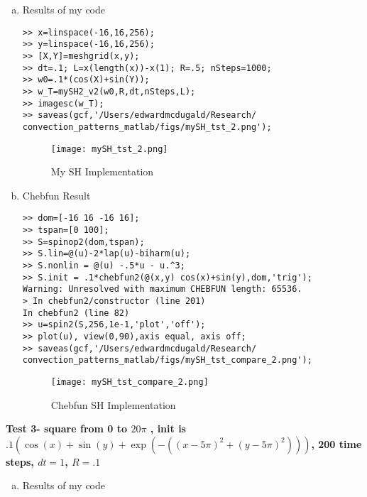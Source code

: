 \documentclass[12pt]{article}
\begin{document}
\begin{enumerate}[(a)]
    \item Results of my code
        \begin{verbatim}
>> x=linspace(-16,16,256);
>> y=linspace(-16,16,256);
>> [X,Y]=meshgrid(x,y);
>> dt=.1; L=x(length(x))-x(1); R=.5; nSteps=1000;
>> w0=.1*(cos(X)+sin(Y));
>> w_T=mySH2_v2(w0,R,dt,nSteps,L);
>> imagesc(w_T);
>> saveas(gcf,'/Users/edwardmcdugald/Research/
convection_patterns_matlab/figs/mySH_tst_2.png');
        \end{verbatim}
     \begin{figure}[ht]
        \centering
        \texttt{[image: mySH\_tst\_2.png]}
        \caption{My SH Implementation}
    \end{figure}

    \item Chebfun Result
        \begin{verbatim}
>> dom=[-16 16 -16 16];
>> tspan=[0 100];
>> S=spinop2(dom,tspan);
>> S.lin=@(u)-2*lap(u)-biharm(u);
>> S.nonlin = @(u) -.5*u - u.^3;
>> S.init = .1*chebfun2(@(x,y) cos(x)+sin(y),dom,'trig');
Warning: Unresolved with maximum CHEBFUN length: 65536. 
> In chebfun2/constructor (line 201)
In chebfun2 (line 82) 
>> u=spin2(S,256,1e-1,'plot','off');
>> plot(u), view(0,90),axis equal, axis off;
>> saveas(gcf,'/Users/edwardmcdugald/Research/
convection_patterns_matlab/figs/mySH_tst_compare_2.png');
        \end{verbatim}
 \begin{figure}[ht]
        \centering
        \texttt{[image: mySH\_tst\_compare\_2.png]}
        \caption{Chebfun SH Implementation}
    \end{figure}
    \FloatBarrier
\end{enumerate}

\textbf{Test 3- square from 0 to $20\pi$ , init is $.1(\cos(x)+\sin(y)+\exp(-((x-5\pi)^2+(y-5\pi)^2)))$, 200 time steps, $dt=1$, $R=.1$}
\begin{enumerate}[(a)]
    \item Results of my code
\end{enumerate}
\end{document}
